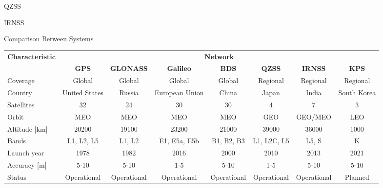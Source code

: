 \begin{frame}{QZSS}

\end{frame}

\begin{frame}{IRNSS}

\end{frame}

\begin{frame}{Comparison Between Systems}

\begin{table}[!ht]
    \centering
    \begin{tabular}{lccccccc}
        \toprule[1.5pt]
        \multirow{2}{*}{\textbf{Characteristic}} & \multicolumn{7}{c}{\textbf{Network}} \\
                                                 & \textbf{GPS} & \textbf{GLONASS} & \textbf{Galileo} & \textbf{BDS} & \textbf{QZSS} & \textbf{IRNSS} & \textbf{KPS} \\
        \midrule
        Coverage      & Global        & Global      & Global         & Global      & Regional    & Regional    & Regional \\
        Country       & United States & Russia      & European Union & China       & Japan       & India       & South Korea\\
        Satellites    & 32            & 24          & 30             & 30          & 4           & 7           & 3 \\
        Orbit         & MEO           & MEO         & MEO            & MEO         & GEO         & GEO/MEO     & LEO \\
        Altitude [km] & 20200         & 19100       & 23200          & 21000       & 39000       & 36000       & 1000 \\
        Bands         & L1, L2, L5    & L1, L2      & E1, E5a, E5b   & B1, B2, B3  & L1, L2C, L5 & L5, S       & K \\
        Launch year   & 1978          & 1982        & 2016           & 2000        & 2010        & 2013        & 2021 \\
        Accuracy [m]  & 5-10          & 5-10        & 1-5            & 5-10        & 1-5         & 5-10        & 5-10 \\
        Status        & Operational   & Operational & Operational    & Operational & Operational & Operational & Planned \\
        \bottomrule[1.5pt]
    \end{tabular}
    \label{tab:networks-comparison}
\end{table}

\end{frame}

